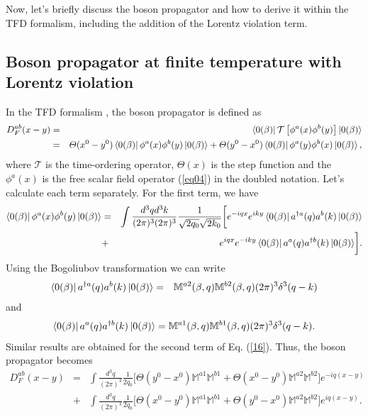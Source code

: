 \documentclass[11pt,showpacs,preprintnumbers,amsmath,amssymb,prd,nofootinbib,superscriptaddress]{revtex4-2}
\begin{document}
Now, let's briefly discuss the boson propagator and how to derive it within the TFD formalism, including the addition of the Lorentz violation term.


\subsection{Boson propagator at finite temperature with Lorentz violation}\label{secpropagator}

In the TFD formalism \cite{temp000, khannatfd}, the boson propagator is defined as
\begin{eqnarray}
    D_{F}^{ab}(x-y)&=&\bra{0(\beta)}\mathcal{T}\left[\phi^a(x)\phi^b(y)\right]\ket{0(\beta)}\nonumber\\
    &=&\Theta(x^0-y^0)\bra{0(\beta)}\phi^a(x)\phi^b(y)\ket{0(\beta)}+\Theta(y^0-x^0)\bra{0(\beta)}\phi^a(y)\phi^b(x)\ket{0(\beta)},\label{16}
\end{eqnarray}
where $\mathcal{T}$ is the time-ordering operator, $\Theta(x)$ is the step function and the $\phi^a(x)$ is the free scalar field operator (\ref{eq04}) in the doubled notation. Let's calculate each term separately. For the first term, we have
\begin{eqnarray}
\bra{0(\beta)}\phi^a(x)\phi^b(y)\ket{0(\beta)}&=&\int\frac{d^3qd^3k}{(2\pi)^3(2\pi)^3}\frac{1}{\sqrt{2q_0}\sqrt{2k_0}}\biggl[e^{-i q x}e^{ik y}\bra{0(\beta)}a^{\dagger a}(q)a^{b}(k)\ket{0(\beta)}\nonumber\\
&+&e^{i q x}e^{-ik y}\bra{0(\beta)}a^{a}(q)a^{\dagger b}(k)\ket{0(\beta)}\biggr].\label{eq18}
\end{eqnarray}
Using the Bogoliubov transformation we can write
\begin{eqnarray}
    \bra{0(\beta)}a^{\dagger a}(q)a^{b}(k)\ket{0(\beta)}&=&\mathbb{M}^{a2}(\beta,q)\mathbb{M}^{b2}(\beta,q)(2\pi)^3\delta^3(q-k)
\end{eqnarray}
and
\begin{eqnarray}
    \bra{0(\beta)}a^{a}(q)a^{\dagger b}(k)\ket{0(\beta)}=\mathbb{M}^{a1}(\beta,q)\mathbb{M}^{b1}(\beta,q)(2\pi)^3\delta^3(q-k).
\end{eqnarray}
Similar results are obtained for the second term of Eq. (\ref{16}). Thus, the boson propagator becomes
\begin{eqnarray}
    D^{ab}_F(x-y)&=&\int\frac{d^3q}{(2\pi)^3}\frac{1}{2q_0}\biggl[\Theta(y^0-x^0)\mathbb{M}^{a1}\mathbb{M}^{b1}+\Theta(x^0-y^0)\mathbb{M}^{a2}\mathbb{M}^{b2}\biggr]e^{-iq(x-y)}\nonumber\\
    &+&\int\frac{d^3q}{(2\pi)^3}\frac{1}{2q_0}\biggl[\Theta(x^0-y^0)\mathbb{M}^{a1}\mathbb{M}^{b1}+\Theta(y^0-x^0)\mathbb{M}^{a2}\mathbb{M}^{b2}\biggr]e^{iq(x-y)}.\label{eq02}
\end{eqnarray}
\end{document}
